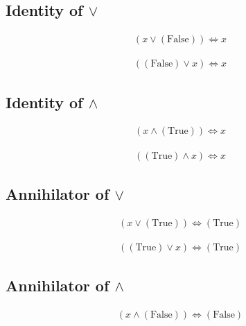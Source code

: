 \subsection{Identity of $\lor$}
\begin{prop}
\label{Proposition:lor_identity_1}
\begin{align*}
(x \lor (\text{False})) \iff x
\end{align*}
\end{prop}

\begin{prop}
\label{Proposition:lor_identity_2}
\begin{align*}
((\text{False}) \lor x) \iff x
\end{align*}
\end{prop}

\subsection{Identity of $\land$}
\begin{prop}
\label{Proposition:land_identity_1}
\begin{align*}
(x \land (\text{True})) \iff x
\end{align*}
\end{prop}

\begin{prop}
\label{Proposition:land_identity_2}
\begin{align*}
((\text{True}) \land x) \iff x
\end{align*}
\end{prop}

\subsection{Annihilator of $\lor$}
\begin{prop}
\label{Proposition:lor_annihilator_1}
\begin{align*}
(x \lor (\text{True})) \iff (\text{True})
\end{align*}
\end{prop}

\begin{prop}
\label{Proposition:lor_annihilator_2}
\begin{align*}
((\text{True}) \lor x) \iff (\text{True})
\end{align*}
\end{prop}

\subsection{Annihilator of $\land$}
\begin{prop}
\label{Proposition:land_annihilator_1}
\begin{align*}
(x \land (\text{False})) \iff (\text{False})
\end{align*}
\end{prop}

